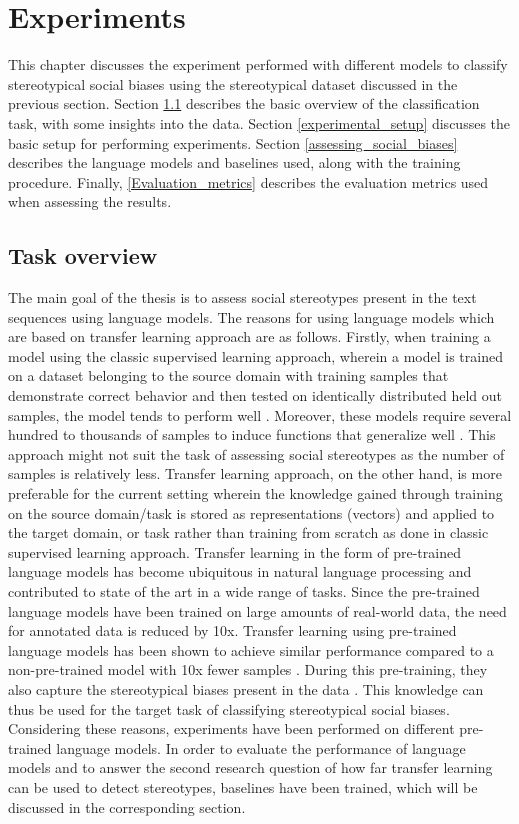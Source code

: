 \chapter{Experiments}

This chapter discusses the experiment performed with different models to classify stereotypical social biases using the stereotypical dataset discussed in the previous section. Section \ref{task_overview} describes the basic overview of the classification task, with some insights into the data. Section \ref{experimental_setup}  discusses the basic setup for performing experiments. Section \ref{assessing_social_biases} describes the language models and baselines used, along with the training procedure. Finally, \ref{Evaluation_metrics} describes the evaluation metrics used when assessing the results.

\section{ Task overview}\label{task_overview}
The main goal of the thesis is to assess social stereotypes present in the text sequences using language models. The reasons for using language models which are based on transfer learning approach are as follows. Firstly, when training a model using the classic supervised learning approach, wherein a model is trained on a dataset belonging to the source domain with training samples that demonstrate correct behavior and then tested on identically distributed held out samples, the model tends to perform well \cite{ruder2019neural}. Moreover, these models require several hundred to thousands of samples to induce functions that generalize well \cite{radford2019language}. This approach might not suit the task of assessing social stereotypes as the number of samples is relatively less. Transfer learning approach, on the other hand, is more preferable for the current setting wherein the knowledge gained through training on the source domain/task is stored as representations (vectors) and applied to the target domain, or task \cite{ruder2019neural} rather than training from scratch as done in classic supervised learning approach. Transfer learning in the form of pre-trained language models has become ubiquitous in natural language processing and contributed to state of the art in a wide range of tasks\cite{ruder2019transfer}. Since the pre-trained language models have been trained on large amounts of real-world data, the need for annotated data is reduced by 10x. Transfer learning using pre-trained language models has been shown to achieve similar performance compared to a non-pre-trained model with 10x fewer samples \cite{howard2018universal}. During this pre-training, they also capture the stereotypical biases present in the data \cite{nadeem2020stereoset}. This knowledge can thus be used for the target task of classifying stereotypical social biases. Considering these reasons, experiments have been performed on different pre-trained language models. In order to evaluate the performance of language models and to answer the second research question of how far transfer learning can be used to detect stereotypes, baselines have been trained, which will be discussed in the corresponding section.

